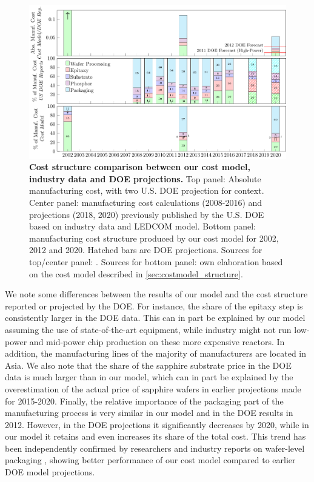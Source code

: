 \documentclass[parskip=full]{article}
\begin{document}
\begin{figure}[h]
	\centering
    \includegraphics[width=\textwidth]{./figures/costmodel_calibration.pdf}
	\caption{\textbf{Cost structure comparison between our cost model, industry data and DOE projections.} Top panel: Absolute manufacturing cost, with two U.S. DOE projection for context. Center panel: manufacturing cost calculations (2008-2016) and projections (2018, 2020) previously published by the U.S. DOE based on industry data and LEDCOM model. Bottom panel: manufacturing cost structure produced by our cost model for 2002, 2012 and 2020. Hatched bars are DOE projections. Sources for top/center panel: \cite{doe2010solid}\cite{doe2011solid}\cite{doe2012solid}\cite{doe2013solid}\cite{doe2014solid}\cite{doe2015solid}\cite{doe2016solid}. Sources for bottom panel: own elaboration based on the cost model described in \cref{sec:costmodel_structure}.}
	\label{fig:costmodel_calibration}
\end{figure}

\textbf{}
We note some differences between the results of our model and the cost structure reported or projected by the DOE. For instance, the share of the epitaxy step is consistently larger in the DOE data. This can in part be explained by our model assuming the use of state-of-the-art equipment, while industry might not run low-power and mid-power chip production on these more expensive reactors. In addition, the manufacturing lines of the majority of manufacturers are located in Asia. We also note that the share of the sapphire substrate price in the DOE data is much larger than in our model, which can in part be explained by the overestimation of the actual price of sapphire wafers in earlier projections made for 2015-2020. Finally, the relative importance of the packaging part of the manufacturing process is very similar in our model and in the DOE results in 2012. However, in the DOE projections it significantly decreases by 2020, while in our model it retains and even increases its share of the total cost. This trend has been independently confirmed by researchers and industry reports on wafer-level packaging \cite{Lee2011WPL,Xie2013,ledsmag2017WLP}, showing better performance of our cost model compared to earlier DOE model projections.

\clearpage
{}
\printbibliography[title=Supplementary References]
\end{document}
